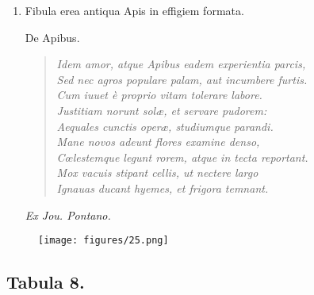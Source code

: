 \documentclass[a4paper, 11pt, oneside, polutonikogreek, latin]{article}
\begin{document}
\begin{enumerate}
    \item Fibula erea antiqua Apis in effigiem formata.
    
    \begin{center}
    De Apibus.
    \end{center}
    
    \begin{quote}
    \emph{Idem amor, atque Apibus eadem experientia parcis,}\\
    \emph{Sed nec agros populare palam, aut incumbere furtis.}\\
    \emph{Cum iuuet è proprio vitam tolerare labore.}\\
    \emph{Justitiam norunt solæ, et servare pudorem:}\\
    \emph{Aequales cunctis operæ, studiumque parandi.}\\
    \emph{Mane novos adeunt flores examine denso,}\\
    \emph{Cœlestemque legunt rorem, atque in tecta reportant.}\\
    \emph{Mox vacuis stipant cellis, ut nectere largo}\\
    \emph{Ignauas ducant hyemes, et frigora temnant.}\\
    \end{quote}
    
    \emph{Ex Jou. Pontano.}
\end{enumerate}
\clearpage
\vspace*{\fill}
\begin{figure}[H]
\centering
\texttt{[image: figures/25.png]}
\end{figure}
\vspace*{\fill}
\clearpage
\subsection*{Tabula 8.}
\end{document}
